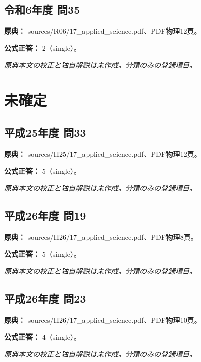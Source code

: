 \subsection{令和6年度 問35}
\label{q:r06-reg-applied-35}

\noindent\textbf{原典：} sources/R06/17\_applied\_science.pdf、PDF物理12頁。

\textbf{公式正答：} 2（single）。

\par\textit{原典本文の校正と独自解説は未作成。分類のみの登録項目。}

\section{未確定}

\subsection{平成25年度 問33}
\label{q:h25-reg-applied-33}

\noindent\textbf{原典：} sources/H25/17\_applied\_science.pdf、PDF物理12頁。

\textbf{公式正答：} 5（single）。

\par\textit{原典本文の校正と独自解説は未作成。分類のみの登録項目。}

\subsection{平成26年度 問19}
\label{q:h26-reg-applied-19}

\noindent\textbf{原典：} sources/H26/17\_applied\_science.pdf、PDF物理8頁。

\textbf{公式正答：} 5（single）。

\par\textit{原典本文の校正と独自解説は未作成。分類のみの登録項目。}

\subsection{平成26年度 問23}
\label{q:h26-reg-applied-23}

\noindent\textbf{原典：} sources/H26/17\_applied\_science.pdf、PDF物理10頁。

\textbf{公式正答：} 4（single）。

\par\textit{原典本文の校正と独自解説は未作成。分類のみの登録項目。}

